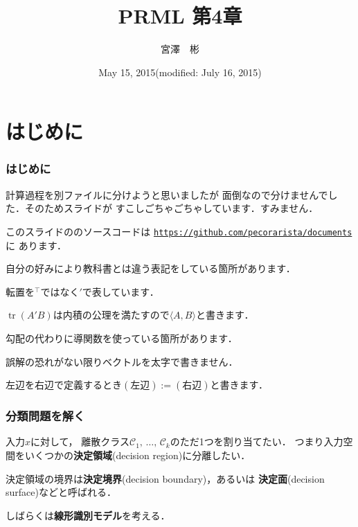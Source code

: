 \documentclass[10pt,hyperref={unicode}]{beamer}
\title{PRML 第4章}
\institute{総合研究大学院大学 博士前期\newline\newline\texttt{miyazawa-a@nii.ac.jp}}
\author{宮澤　彬}
\date{May 15, 2015\newline(modified: July 16, 2015)}
\DeclareMathOperator*{\tr}{tr}
\newenvironment{wideitemize}{\itemize\addtolength{\itemsep}{1em}}{\enditemize}
\begin{document}
\nocite{bishop2008}
\begin{frame}
\maketitle
\end{frame}

\section{はじめに}

\begin{frame}
    \frametitle{はじめに}
    \begin{wideitemize}
        \item 計算過程を別ファイルに分けようと思いましたが
            面倒なので分けませんでした．そのためスライドが
            すこしごちゃごちゃしています．すみません．
        \item このスライドの{\LuaLaTeX}のソースコードは
            \href{https://github.com/pecorarista/documents}{\texttt{https://github.com/pecorarista/documents}}に
            あります．
        \item 自分の好みにより教科書とは違う表記をしている箇所があります．
            \begin{wideitemize}
                \item 転置を${}^\top$ではなく${}'$で表しています．
                \item $\tr (A'B)$は内積の公理を満たすので$\langle A, B\rangle$と書きます．
                \item 勾配の代わりに導関数を使っている箇所があります．
                \item 誤解の恐れがない限りベクトルを太字で書きません．
                \item 左辺を右辺で定義するとき$(\text{左辺}):=(\text{右辺})$と書きます．
            \end{wideitemize}
    \end{wideitemize}
\end{frame}

\begin{frame}
    \frametitle{分類問題を解く}
    入力$x$に対して，
    離散クラス$\mathcal{C}_1,\,\ldots,\,\mathcal{C}_k$のただ1つを割り当てたい．
    つまり入力空間をいくつかの\textbf{決定領域}(decision region)に分離したい．

    \bigskip

    決定領域の境界は\textbf{決定境界}(decision boundary)，あるいは
    \textbf{決定面}(decision surface)などと呼ばれる．

    \bigskip

    しばらくは\textbf{線形識別モデル}を考える．

\end{frame}
\end{document}
